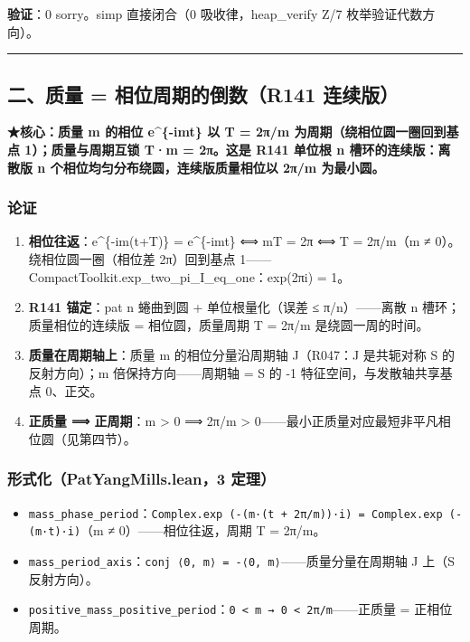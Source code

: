 \documentclass[
]{article}
\providecommand{\tightlist}{%
 \setlength{\itemsep}{0pt}\setlength{\parskip}{0pt}}
\begin{document}
\textbf{验证}：0 sorry。simp 直接闭合（0 吸收律，heap\_verify Z/7
枚举验证代数方向）。

\begin{center}\rule{0.5\linewidth}{0.5pt}\end{center}

\subsection{二、质量 = 相位周期的倒数（R141
连续版）}\label{ux4e8cux8d28ux91cf-ux76f8ux4f4dux5468ux671fux7684ux5012ux6570r141-ux8fdeux7eedux7248}

\textbf{★核心：质量 m 的相位 e\^{}\{-imt\} 以 T = 2π/m
为周期（绕相位圆一圈回到基点 1）；质量与周期互锁 T·m = 2π。这是 R141
单位根 n 槽环的连续版：离散版 n 个相位均匀分布绕圆，连续版质量相位以
2π/m 为最小圆。}

\subsubsection{论证}\label{ux8bbaux8bc1-1}

\begin{enumerate}
\def\labelenumi{\arabic{enumi}.}
\tightlist
\item
 \textbf{相位往返}：e\^{}\{-im(t+T)\} = e\^{}\{-imt\} ⟺ mT = 2π ⟺ T =
 2π/m（m ≠ 0）。绕相位圆一圈（相位差 2π）回到基点
 1------CompactToolkit.exp\_two\_pi\_I\_eq\_one：exp(2πi) = 1。
\item
 \textbf{R141 锚定}：pat n 蜷曲到圆 + 单位根量化（误差 ≤
 π/n）------离散 n 槽环；质量相位的连续版 = 相位圆，质量周期 T = 2π/m
 是绕圆一周的时间。
\item
 \textbf{质量在周期轴上}：质量 m 的相位分量沿周期轴 J（R047：J
 是共轭对称 S 的反射方向）；m 倍保持方向------周期轴 = S 的 -1
 特征空间，与发散轴共享基点 0、正交。
\item
 \textbf{正质量 ⟹ 正周期}：m \textgreater{} 0 ⟹ 2π/m \textgreater{}
 0------最小正质量对应最短非平凡相位圆（见第四节）。
\end{enumerate}

\subsubsection{形式化（PatYangMills.lean，3
定理）}\label{ux5f62ux5f0fux5316patyangmills.lean3-ux5b9aux7406}

\begin{itemize}
\tightlist
\item
 \texttt{mass\_phase\_period}：\texttt{Complex.exp\ (-(m·(t\ +\ 2π/m))·i)\ =\ Complex.exp\ (-(m·t)·i)}（m
 ≠ 0）------相位往返，周期 T = 2π/m。
\item
 \texttt{mass\_period\_axis}：\texttt{conj\ ⟨0,\ m⟩\ =\ -⟨0,\ m⟩}------质量分量在周期轴
 J 上（S 反射方向）。
\item
 \texttt{positive\_mass\_positive\_period}：\texttt{0\ \textless{}\ m\ →\ 0\ \textless{}\ 2π/m}------正质量
 = 正相位周期。
\end{itemize}
\end{document}
